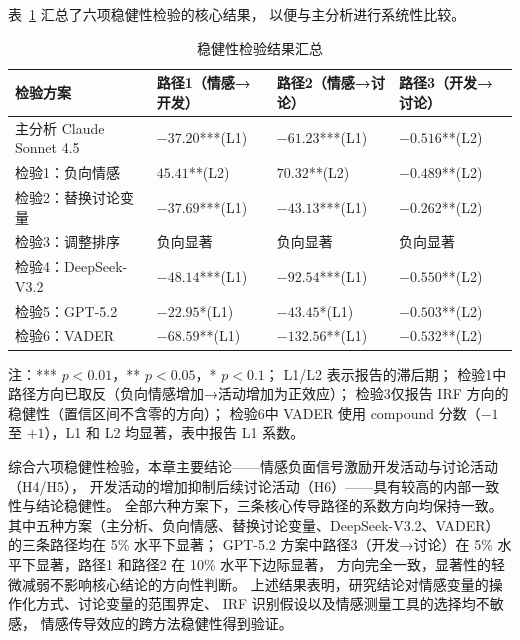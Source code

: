 表~\ref{tab:robustness} 汇总了六项稳健性检验的核心结果，
以便与主分析进行系统性比较。

\begin{table}[htbp]
    \centering
    \caption{稳健性检验结果汇总}
    \label{tab:robustness}
    \small
    \begin{tabularx}{\textwidth}{p{3.6cm}XXX}
        \toprule
        检验方案 & 路径1（情感→开发） & 路径2（情感→讨论） & 路径3（开发→讨论） \\
        \midrule
        主分析 Claude Sonnet 4.5 &
            $-37.20$***(L1) &
            $-61.23$***(L1) &
            $-0.516$**(L2) \\[3pt]
        检验1：负向情感 &
            $45.41$**(L2) &
            $70.32$**(L2) &
            $-0.489$**(L2) \\[3pt]
        检验2：替换讨论变量 &
            $-37.69$***(L1) &
            $-43.13$***(L1) &
            $-0.262$**(L2) \\[3pt]
        检验3：调整排序 &
            负向显著 &
            负向显著 &
            负向显著 \\[3pt]
        检验4：DeepSeek-V3.2 &
            $-48.14$***(L1) &
            $-92.54$***(L1) &
            $-0.550$**(L2) \\[3pt]
        检验5：GPT-5.2 &
            $-22.95$*(L1) &
            $-43.45$*(L1) &
            $-0.503$**(L2) \\[3pt]
        检验6：VADER &
            $-68.59$**(L1) &
            $-132.56$**(L1) &
            $-0.532$**(L2) \\
        \bottomrule
    \end{tabularx}
    \begin{minipage}{\textwidth}
        \vspace{0.3em}
        \footnotesize 注：*** $p<0.01$，** $p<0.05$，* $p<0.1$；
        L1/L2 表示报告的滞后期；
        检验1中路径方向已取反（负向情感增加→活动增加为正效应）；
        检验3仅报告 IRF 方向的稳健性（置信区间不含零的方向）；
        检验6中 VADER 使用 compound 分数（$-1$ 至 $+1$），L1 和 L2 均显著，表中报告 L1 系数。
    \end{minipage}
\end{table}

综合六项稳健性检验，本章主要结论——情感负面信号激励开发活动与讨论活动（H4/H5），
开发活动的增加抑制后续讨论活动（H6）——具有较高的内部一致性与结论稳健性。
全部六种方案下，三条核心传导路径的系数方向均保持一致。
其中五种方案（主分析、负向情感、替换讨论变量、DeepSeek-V3.2、VADER）的三条路径均在 5\% 水平下显著；
GPT-5.2 方案中路径3（开发→讨论）在 5\% 水平下显著，路径1 和路径2 在 10\% 水平下边际显著，
方向完全一致，显著性的轻微减弱不影响核心结论的方向性判断。
上述结果表明，研究结论对情感变量的操作化方式、讨论变量的范围界定、
IRF 识别假设以及情感测量工具的选择均不敏感，
情感传导效应的跨方法稳健性得到验证。


